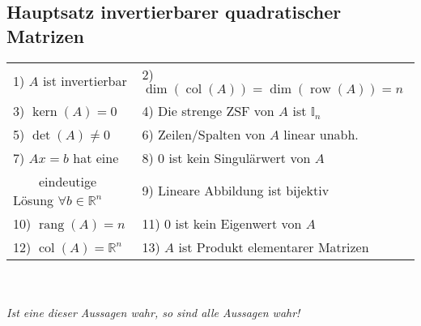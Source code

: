 \documentclass[german, 6pt]{latex4ei/latex4ei_sheet}
\DeclareMathOperator{\rang}{rang}
\DeclareMathOperator{\col}{col}
\DeclareMathOperator{\row}{row}
\DeclareMathOperator{\Kern}{kern}
\begin{document}
\subsection{Hauptsatz invertierbarer quadratischer Matrizen}
\begin{tabular}{ll}
	1)  $A$ ist invertierbar & 2) $\dim(\col(A))=\dim(\row(A))=n$\\
	3)  $\Kern(A)={0}$ & 4) Die strenge ZSF von $A$ ist $\mathbb{I}_n$\\
	5) $\det(A)\ne0$ & 6) Zeilen/Spalten von $A$ linear unabh.\\
	7) $Ax=b$ hat eine & 8) $0$ ist kein Singulärwert von $A$\\\ \ \ \ eindeutige Lösung $\forall b\in\mathbb{R}^n$ & 9) Lineare Abbildung ist bijektiv\\
	10)  $\rang(A)=n$ & 11) $0$ ist kein Eigenwert von $A$\\
	12) $\col(A)=\mathbb{R}^n$ & 13) $A$ ist Produkt elementarer Matrizen\\
\end{tabular}\\ \\
\textit{Ist eine dieser Aussagen wahr, so sind alle Aussagen wahr!}
\end{document}

